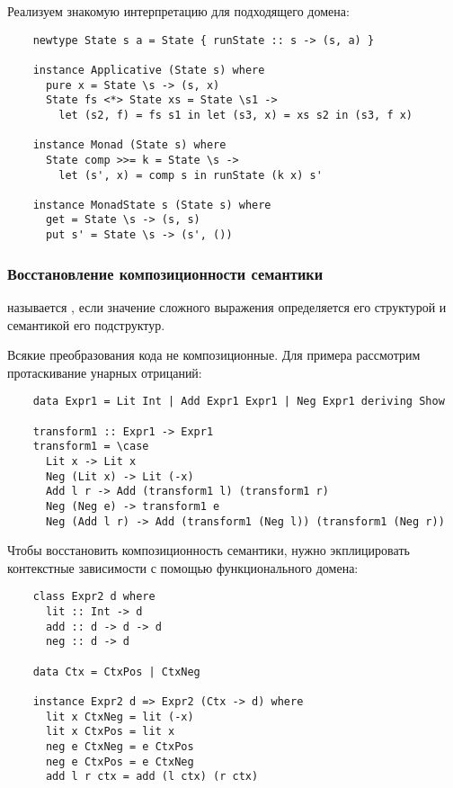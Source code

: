 Реализуем знакомую интерпретацию для подходящего домена:
\begin{verbatim}
    newtype State s a = State { runState :: s -> (s, a) }

    instance Applicative (State s) where
      pure x = State \s -> (s, x)
      State fs <*> State xs = State \s1 ->
        let (s2, f) = fs s1 in let (s3, x) = xs s2 in (s3, f x)

    instance Monad (State s) where
      State comp >>= k = State \s ->
        let (s', x) = comp s in runState (k x) s'

    instance MonadState s (State s) where
      get = State \s -> (s, s)
      put s' = State \s -> (s', ())
\end{verbatim}

\subsubsection{Восстановление композиционности семантики} \label{subsubsec:recover-compositionality}

 называется , если значение сложного выражения определяется его структурой и семантикой его подструктур. %

Всякие преобразования кода не композиционные.
Для примера рассмотрим протаскивание унарных отрицаний:
\begin{verbatim}
    data Expr1 = Lit Int | Add Expr1 Expr1 | Neg Expr1 deriving Show

    transform1 :: Expr1 -> Expr1
    transform1 = \case
      Lit x -> Lit x
      Neg (Lit x) -> Lit (-x)
      Add l r -> Add (transform1 l) (transform1 r)
      Neg (Neg e) -> transform1 e
      Neg (Add l r) -> Add (transform1 (Neg l)) (transform1 (Neg r))
\end{verbatim}

Чтобы восстановить композиционность семантики, нужно экплицировать контекстные зависимости с помощью функционального домена:
\begin{verbatim}
    class Expr2 d where
      lit :: Int -> d
      add :: d -> d -> d
      neg :: d -> d

    data Ctx = CtxPos | CtxNeg

    instance Expr2 d => Expr2 (Ctx -> d) where
      lit x CtxNeg = lit (-x)
      lit x CtxPos = lit x
      neg e CtxNeg = e CtxPos
      neg e CtxPos = e CtxNeg
      add l r ctx = add (l ctx) (r ctx)
\end{verbatim}





